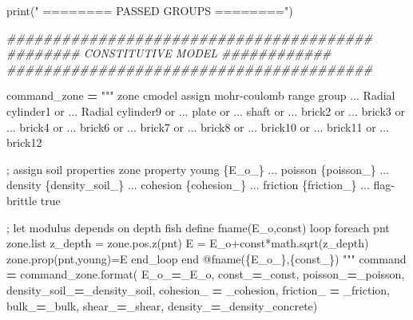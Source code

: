 \documentclass[a4paper, nobind]{templates/ociamthesis}
\newenvironment{Shaded}{\begin{snugshade}}{\end{snugshade}}
\newcommand{\BuiltInTok}[1]{#1}
\newcommand{\CommentTok}[1]{\textcolor[rgb]{0.56,0.35,0.01}{\textit{#1}}}
\newcommand{\NormalTok}[1]{#1}
\newcommand{\OperatorTok}[1]{\textcolor[rgb]{0.81,0.36,0.00}{\textbf{#1}}}
\newcommand{\SpecialCharTok}[1]{\textcolor[rgb]{0.00,0.00,0.00}{#1}}
\newcommand{\StringTok}[1]{\textcolor[rgb]{0.31,0.60,0.02}{#1}}
\renewenvironment{Shaded}
{
  \vspace{10pt}%
  \begin{snugshade}%
}{%
  \end{snugshade}%
  \vspace{8pt}%
}
\begin{document}
\begin{Shaded}
\begin{Highlighting}[]
\BuiltInTok{print}\NormalTok{(}\StringTok{"               ======== PASSED GROUPS ========"}\NormalTok{)}

\CommentTok{\#\#\#\#\#\#\#\#\#\#\#\#\#\#\#\#\#\#\#\#\#\#\#\#\#\#\#\#\#\#\#\#\#\#\#\#\#\#\#\#}
\CommentTok{\#\#\#\#\#\#\#\# CONSTITUTIVE MODEL \#\#\#\#\#\#\#\#\#\#\#\#}
\CommentTok{\#\#\#\#\#\#\#\#\#\#\#\#\#\#\#\#\#\#\#\#\#\#\#\#\#\#\#\#\#\#\#\#\#\#\#\#\#\#\#\#}

\NormalTok{command\_zone }\OperatorTok{=} \StringTok{"""}
\StringTok{zone cmodel assign mohr{-}coulomb range group ...}
\StringTok{\textquotesingle{}Radial cylinder1\textquotesingle{} or ...}
\StringTok{\textquotesingle{}Radial cylinder9\textquotesingle{} or ...}
\StringTok{\textquotesingle{}plate\textquotesingle{} or ...}
\StringTok{\textquotesingle{}shaft\textquotesingle{} or ...}
\StringTok{\textquotesingle{}brick2\textquotesingle{} or ...}
\StringTok{\textquotesingle{}brick3\textquotesingle{} or ...}
\StringTok{\textquotesingle{}brick4\textquotesingle{} or ...}
\StringTok{\textquotesingle{}brick6\textquotesingle{} or ...}
\StringTok{\textquotesingle{}brick7\textquotesingle{} or ...}
\StringTok{\textquotesingle{}brick8\textquotesingle{} or ...}
\StringTok{\textquotesingle{}brick10\textquotesingle{} or ...}
\StringTok{\textquotesingle{}brick11\textquotesingle{} or ...}
\StringTok{\textquotesingle{}brick12\textquotesingle{}}

\StringTok{; assign soil properties}
\StringTok{zone property young }\SpecialCharTok{\{E\_o\_\}}\StringTok{ ...}
\StringTok{poisson }\SpecialCharTok{\{poisson\_\}}\StringTok{ ...}
\StringTok{density }\SpecialCharTok{\{density\_soil\_\}}\StringTok{ ...}
\StringTok{cohesion }\SpecialCharTok{\{cohesion\_\}}\StringTok{ ...}
\StringTok{friction }\SpecialCharTok{\{friction\_\}}\StringTok{ ...}
\StringTok{flag{-}brittle true}

\StringTok{; let modulus depends on depth}
\StringTok{fish define fname(E\_o,const)}
\StringTok{loop foreach pnt zone.list}
\StringTok{z\_depth = zone.pos.z(pnt)}
\StringTok{E = E\_o+const*math.sqrt(z\_depth)}
\StringTok{zone.prop(pnt,\textquotesingle{}young\textquotesingle{})=E}
\StringTok{end\_loop}
\StringTok{end}
\StringTok{@fname(}\SpecialCharTok{\{E\_o\_\}}\StringTok{,}\SpecialCharTok{\{const\_\}}\StringTok{)}
\StringTok{"""}
\NormalTok{command }\OperatorTok{=}\NormalTok{ command\_zone.}\BuiltInTok{format}\NormalTok{(}
\NormalTok{E\_o\_}\OperatorTok{=}\NormalTok{\_E\_o,}
\NormalTok{const\_}\OperatorTok{=}\NormalTok{\_const,}
\NormalTok{poisson\_}\OperatorTok{=}\NormalTok{\_poisson,}
\NormalTok{density\_soil\_}\OperatorTok{=}\NormalTok{\_density\_soil,}
\NormalTok{cohesion\_ }\OperatorTok{=}\NormalTok{ \_cohesion,}
\NormalTok{friction\_ }\OperatorTok{=}\NormalTok{ \_friction,}
\NormalTok{bulk\_}\OperatorTok{=}\NormalTok{\_bulk,}
\NormalTok{shear\_}\OperatorTok{=}\NormalTok{\_shear,}
\NormalTok{density\_}\OperatorTok{=}\NormalTok{\_density\_concrete)}


\end{Highlighting}
\end{Shaded}
\end{document}
